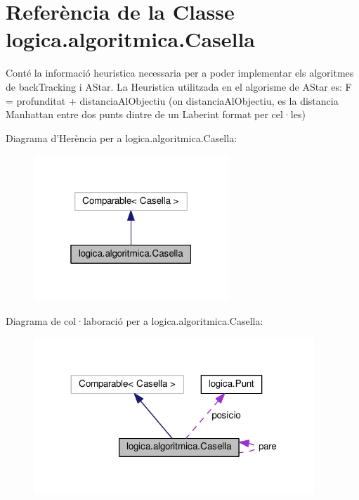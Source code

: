 \hypertarget{classlogica_1_1algoritmica_1_1_casella}{\section{Referència de la Classe logica.\+algoritmica.\+Casella}
\label{classlogica_1_1algoritmica_1_1_casella}
}


Conté la informació heuristica necessaria per a poder implementar els algoritmes de back\+Tracking i A\+Star. La Heuristica utilitzada en el algorisme de A\+Star es\+: F = profunditat + distancia\+Al\+Objectiu (on distancia\+Al\+Objectiu, es la distancia Manhattan entre dos punts dintre de un Laberint format per cel·les)  




Diagrama d'Herència per a logica.\+algoritmica.\+Casella\+:
\nopagebreak
\begin{figure}[H]
\begin{center}
\leavevmode
\includegraphics[width=208pt]{classlogica_1_1algoritmica_1_1_casella__inherit__graph}
\end{center}
\end{figure}


Diagrama de col·laboració per a logica.\+algoritmica.\+Casella\+:
\nopagebreak
\begin{figure}[H]
\begin{center}
\leavevmode
\includegraphics[width=299pt]{classlogica_1_1algoritmica_1_1_casella__coll__graph}
\end{center}
\end{figure}
